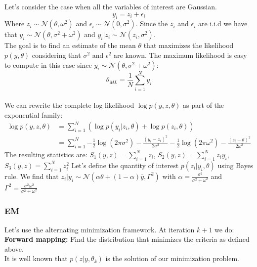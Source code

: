 \documentclass[a4paper]{article}
\theoremstyle{plain}
\theoremstyle{plain}
\theoremstyle{definition}
\begin{document}
Let's consider the case when all the variables of interest are Gaussian.
\begin{equation}
y_i = z_i + \epsilon_i
\end{equation}
Where $z_i \sim \mathcal{N}(\theta,\omega^2)$ and $\epsilon_i \sim \mathcal{N}(0,\sigma^2)$.
Since the $z_i$ and $\epsilon_i$ are i.i.d we have that $y_i \sim \mathcal{N}(\theta,\sigma^2 + \omega^2)$ and $y_i|z_i \sim \mathcal{N}(z_i,\sigma^2)$.\\
The goal is to find an estimate of the mean $\theta$ that maximizes the likelihood $p(y,\theta)$ considering that $\sigma^2$ and $\epsilon^2$ are known. The maximum likelihood is easy to compute in this case since $y_i \sim \mathcal{N}(\theta,\sigma^2 + \omega^2)$:
\begin{equation}
\theta_{ML} = \frac{1}{N}\sum_{i=1}^{N}{y_i}
\end{equation}\\

We can rewrite the complete log likelihood $\log p(y,z,\theta)$ as part of the exponential family:
\begin{equation}
\begin{split}
\log p(y,z,\theta) & = \sum_{i=1}^{N}{(\log p(y_i|z_i,\theta) + \log p(z_i,\theta))}\\
& = \sum_{i=1}^{N}{-\frac{1}{2}\log(2\pi\sigma^2) -\frac{(y_i - z_i)^2}{2\sigma^2} -\frac{1}{2}\log(2\pi\omega^2) -\frac{(z_i - \theta)^2}{2\omega^2}}
\end{split}
\end{equation}
The resulting statistics are: $S_1(y,z) = \sum_{i=1}^{N}{z_i} $, $S_2(y,z) = \sum_{i=1}^{N}{z_iy_i} $,$S_3(y,z) = \sum_{i=1}^{N}{z_i^2} $
Let's define the quantity of interest $p(z_i|y_i,\theta)$ using Bayes rule.
We find that $z_i|y_i \sim \mathcal{N}(\alpha\theta+(1-\alpha)\bar{y}, \Gamma^2)$ with $\alpha = \frac{\sigma^2}{\sigma^2+\omega^2}$ and $\Gamma^2 = \frac{\sigma^2\omega^2}{\sigma^2+\omega^2}$


\subsubsection{EM}
Let's use the alternating minimization framework. At iteration $k+1$ we do:\\
\textbf{Forward mapping:} Find the distribution that minimizes the criteria as defined above.\\
It is well known that $p(z|y,\theta_k)$ is the solution of our minimization problem.
\end{document}

